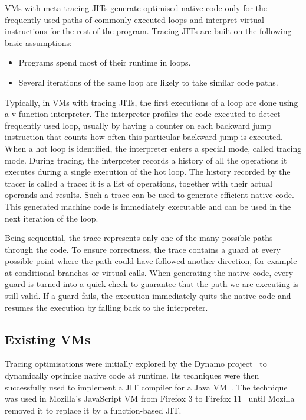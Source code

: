 \documentclass[a4paper,12pt,twoside]{../includes/ThesisStyle}
\begin{document}
VMs with meta-tracing JITs generate optimised native code only for the frequently used paths of commonly executed loops and interpret virtual instructions for the rest of the program. Tracing JITs are built on the following basic assumptions:
\begin{itemize}
	\item Programs spend most of their runtime in loops.
	\item Several iterations of the same loop are likely to take similar code paths.
\end{itemize}

Typically, in VMs with tracing JITs, the first executions of a loop are done using a v-function interpreter. The interpreter profiles the code executed to detect frequently used loop, usually by having a counter on each backward jump instruction that counts how often this particular backward jump is executed. When a hot loop is identified, the interpreter enters a special mode, called tracing mode. During tracing, the interpreter records a history of all the operations it executes during a single execution of the hot loop. The history recorded by the tracer is called a trace: it is a list of operations, together with their actual operands and results. Such a trace can be used to generate efficient native code. This generated machine code is immediately executable and can be used in the next iteration of the loop.

Being sequential, the trace represents only one of the many possible paths through the code. To ensure correctness, the trace contains a guard at every possible point where the path could have followed another direction, for example at conditional branches or virtual calls. When generating the native code, every guard is turned into a quick check to guarantee that the path we are executing is still valid. If a guard fails, the execution immediately quits the native code and resumes the execution by falling back to the interpreter.

\subsection{Existing VMs}
\label{sec:existing2}

Tracing optimisations were initially explored by the Dynamo project~\cite{Bala00a} to dynamically optimise native code at runtime. Its techniques were then successfully used to implement a JIT compiler for a Java VM~\cite{Gal06a}. The technique was used in Mozilla's JavaScript VM from Firefox 3 to Firefox 11~\cite{Gal09a} until Mozilla removed it to replace it by a function-based JIT. 
\end{document}
